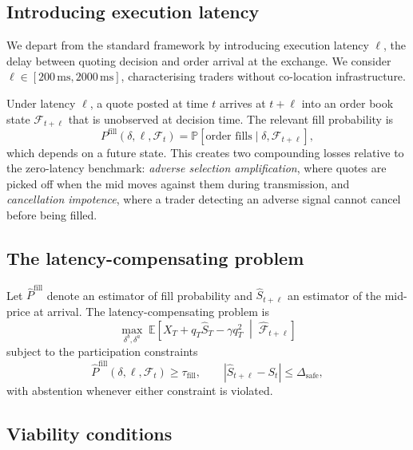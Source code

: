\documentclass[11pt]{article}
\begin{document}
\subsection{Introducing execution latency}

We depart from the standard framework by introducing execution latency $\ell$,
the delay between quoting decision and order arrival at the exchange. We
consider $\ell \in [200\,\text{ms}, 2000\,\text{ms}]$, characterising traders
without co-location infrastructure.

Under latency $\ell$, a quote posted at time $t$ arrives at $t + \ell$ into an
order book state $\mathcal{F}_{t+\ell}$ that is unobserved at decision time. The
relevant fill probability is
\begin{equation}
P^{\text{fill}}(\delta, \ell, \mathcal{F}_t)
= \mathbb{P}\!\left[\text{order fills} \mid \delta, \mathcal{F}_{t+\ell}\right],
\end{equation}
which depends on a future state. This creates two compounding losses relative to
the zero-latency benchmark: \emph{adverse selection amplification}, where quotes
are picked off when the mid moves against them during transmission, and
\emph{cancellation impotence}, where a trader detecting an adverse signal cannot
cancel before being filled.

\subsection{The latency-compensating problem}

Let $\widehat{P}^{\text{fill}}$ denote an estimator of fill probability and
$\widehat{S}_{t+\ell}$ an estimator of the mid-price at arrival. The
latency-compensating problem is
\begin{equation}
\max_{\delta^b,\delta^a} \;
\mathbb{E}\!\left[ X_T + q_T \widehat{S}_T - \gamma q_T^2
\;\middle|\; \widehat{\mathcal{F}}_{t+\ell} \right]
\end{equation}
subject to the participation constraints
\begin{equation}
\widehat{P}^{\text{fill}}(\delta, \ell, \mathcal{F}_t) \geq \tau_{\text{fill}},
\qquad
\left| \widehat{S}_{t+\ell} - S_t \right| \leq \Delta_{\text{safe}},
\label{eq:abstain}
\end{equation}
with abstention whenever either constraint is violated.

\subsection{Viability conditions}
\label{sec:conditions}
\end{document}
